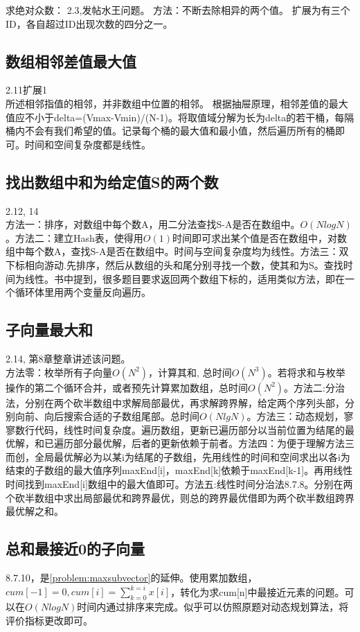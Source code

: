 求绝对众数：
\cite{bop}2.3,发帖水王问题。
方法：不断去除相异的两个值。
扩展为有三个ID，各自超过ID出现次数的四分之一。

\subsection{数组相邻差值最大值}
\cite{bop}2.11扩展1\\
所述相邻指值的相邻，并非数组中位置的相邻。
根据抽屉原理，相邻差值的最大值应不小于delta=(Vmax-Vmin)/(N-1)。将取值域分解为长为delta的若干桶，每隔桶内不会有我们希望的值。记录每个桶的最大值和最小值，然后遍历所有的桶即可。时间和空间复杂度都是线性。



\subsection{找出数组中和为给定值S的两个数}
\cite{bop}2.12, \cite{ms100}14\\
方法一：排序，对数组中每个数A，用二分法查找S-A是否在数组中。$O(NlogN)$。方法二：建立Hash表，使得用$O(1)$时间即可求出某个值是否在数组中，对数组中每个数A，查找S-A是否在数组中。时间与空间复杂度均为线性。方法三：双下标相向游动.先排序，然后从数组的头和尾分别寻找一个数，使其和为S。查找时间为线性。书中提到，很多题目要求返回两个数组下标的，适用类似方法，即在一个循环体里用两个变量反向遍历。

\subsection{子向量最大和}
\cite{bop}2.14, \cite{pp}第8章整章讲述该问题。\label{problem:maxsubvector}\\
方法零：枚举所有子向量$O(N^2)$，计算其和, 总时间$O(N^3)$。若将求和与枚举操作的第二个循环合并，或者预先计算累加数组，总时间$O(N^2)$。方法二:分治法，分别在两个砍半数组中求解局部最优，再求解跨界解，给定两个序列头部，分别向前、向后搜索合适的子数组尾部。总时间$O(NlgN)$。方法三：动态规划，寥寥数行代码，线性时间复杂度。遍历数组，更新已遍历部分以当前位置为结尾的最优解，和已遍历部分最优解，后者的更新依赖于前者。方法四：\cite{self}为便于理解方法三而创，全局最优解必为以某i为结尾的子数组，先用线性的时间和空间求出以各i为结束的子数组的最大值序列maxEnd[i]，maxEnd[k]依赖于maxEnd[k-1]。再用线性时间找到maxEnd[i]数组中的最大值即可。方法五:线性时间分治法\cite{pp}8.7.8。分别在两个砍半数组中求出局部最优和跨界最优，则总的跨界最优借即为两个砍半数组跨界最优解之和。
\label{subsec:maxsubsum}

\subsection{总和最接近0的子向量}
\cite{pp}8.7.10，是\ref{problem:maxsubvector}的延伸。使用累加数组，$cum[-1]=0,cum[i]=\sum_{k=0}^{k=i}{x[i]}$，转化为求cum[n]中最接近元素的问题。可以在$O(NlogN)$时间内通过排序来完成。似乎可以仿照原题对动态规划算法，将评价指标更改即可。\label{problem:zerosubvec}

